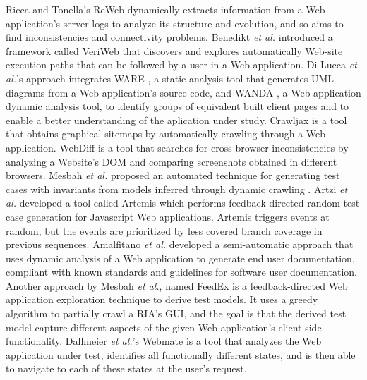 Ricca and Tonella's ReWeb \cite{ricca2001understanding} dynamically extracts information from a Web application's server logs to analyze its structure and evolution, and so aims to find inconsistencies and connectivity problems. Benedikt \textit{et al.} introduced a framework called VeriWeb \cite{benedikt2002veriWeb} that discovers and explores automatically Web-site execution paths that can be followed by a user in a Web application.
Di Lucca \textit{et al.}'s approach \cite{di2005integrating} integrates WARE \cite{di2004reverse}, a static analysis tool that generates UML diagrams from a Web application's source code, and WANDA \cite{antoniol2004understanding}, a Web application dynamic analysis tool, to identify groups of equivalent built client pages and to enable a better understanding of the aplication under study. 
Crawljax \cite{roest2010automated} is a tool that obtains graphical sitemaps by automatically crawling through a Web application. WebDiff \cite{choudhary2010Webdiff} is a tool that searches for cross-browser inconsistencies by analyzing a Website's DOM and comparing screenshots obtained in different browsers. 
Mesbah \textit{et al.} proposed an automated technique for generating test cases with invariants from models inferred through dynamic crawling \cite{mesbah2012invariant}. 
Artzi \textit{et al.} developed a tool called Artemis \cite{artzi2011framework} which performs feedback-directed random test case generation for Javascript Web applications. Artemis triggers events at random, but the events are prioritized by less covered branch coverage in previous sequences.
Amalfitano \textit{et al.} developed a semi-automatic approach \cite{amalfitano2011using} that uses dynamic analysis of a Web application to generate end user documentation, compliant with known standards and guidelines for software user documentation. 
Another approach by Mesbah \textit{et al.}, named FeedEx \cite{fard2013feedback} is a feedback-directed Web application exploration technique to derive test models. It uses a greedy algorithm to partially crawl a RIA's GUI, and the goal is that the derived test model capture different aspects of the given Web application’s client-side functionality.  Dallmeier \textit{et al.}'s Webmate \cite{dallmeier2012Webmate,dallmeier2013Webmate} is a tool that analyzes the Web application under test, identifies all functionally different states, and is then able to navigate to each of these states at the user’s request. 


